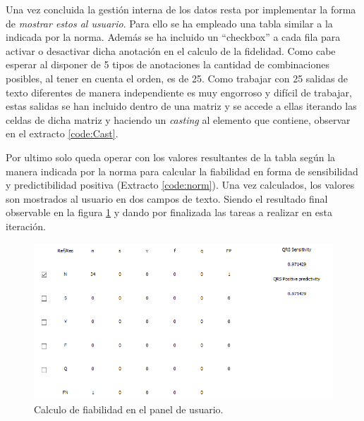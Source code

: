     \clearpage
    Una vez concluida la gestión interna de los datos resta por implementar la forma de\textit{ mostrar estos al usuario}. Para ello se ha empleado una tabla similar a la indicada por la norma.\cite{Aenor2002} Además se ha incluido un ``checkbox'' a cada fila para activar o desactivar dicha anotación en el calculo de la fidelidad. Como cabe esperar al disponer de 5 tipos de anotaciones la cantidad de combinaciones posibles, al tener en cuenta el orden, es de 25. Como trabajar con 25 salidas de texto diferentes de manera independiente es muy engorroso y difícil de trabajar, estas salidas se han incluido dentro de una matriz y se accede a ellas iterando las celdas de dicha matriz y haciendo un \textit{casting} al elemento que contiene, observar en el extracto \ref{code:Cast}. 
        
        
    Por ultimo solo queda operar con los valores resultantes de la tabla según la manera indicada por la norma para calcular la fiabilidad en forma de sensibilidad y predictibilidad positiva (Extracto \ref{code:norm}). Una vez calculados, los valores son mostrados al usuario en dos campos de texto. Siendo el resultado final observable en la figura \ref{fig:fiability} y dando por finalizada las tareas a realizar en esta iteración.
        
        
    \begin{figure}[H]
            \centering
                    \includegraphics[width = \linewidth]{figuras/fiabilidad.PNG}
            \caption{Calculo de fiabilidad en el panel de usuario.}
            \label{fig:fiability}
    \end{figure}
        
